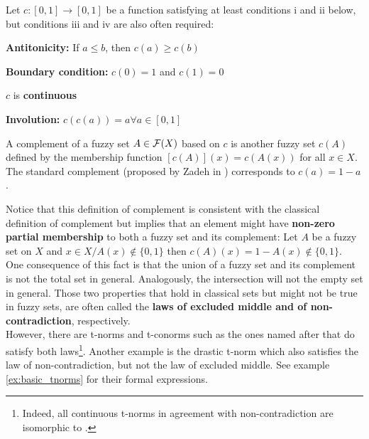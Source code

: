 \begin{definition}[Complement]
Let $c : [0,1] \rightarrow [0,1]$ be a function satisfying at least conditions i and ii below, but conditions iii and iv are also often required:
  \begin{romanenum}
    \item \textbf{Antitonicity:} If $a \leq b$, then $c(a) \geq c(b)$
    \item \textbf{Boundary condition:} $c(0) = 1$ and $c(1) = 0$ 
    \item $c$ is \textbf{continuous}
    \item \textbf{Involution:} $c(c(a)) = a \forall a \in [0,1]$
  \end{romanenum}
  A complement of a fuzzy set $A \in \mathcal{F}(X)$ based on $c$ is another fuzzy set $c(A)$ defined by the membership function $[c(A)](x) = c(A(x))$ for all $x \in X$.\\

  The standard complement (proposed by Zadeh in \cite{Zadeh1965}) corresponds to $c(a) = 1 - a$.
\end{definition}


Notice that this definition of complement is consistent with the classical definition of complement but implies that an element might have \textbf{non-zero partial membership} to both a fuzzy set and its complement: Let $A$ be a fuzzy set on $X$ and $x \in X / A(x)\notin \{0,1\}$ then $c( A)(x)= 1 - A(x) \notin \{0,1\}$.\\

One consequence of this fact is that the union of a fuzzy set and its complement is not the total set in general. Analogously, the intersection will not the empty set in general. Those two properties that hold in classical sets but might not be true in fuzzy sets, are often called the \textbf{laws of excluded middle and of non-contradiction}, respectively.\\

However, there are t-norms and t-conorms such as the ones named after \luka that do satisfy both laws\footnote{Indeed, all continuous t-norms in agreement with non-contradiction are isomorphic to \luka \cite[p.~7]{LukasiewiczNonContrad}.}. Another example is the drastic t-norm which also satisfies the law of non-contradiction, but not the law of excluded middle. See example \ref{ex:basic_tnorms} for their formal expressions. \\

